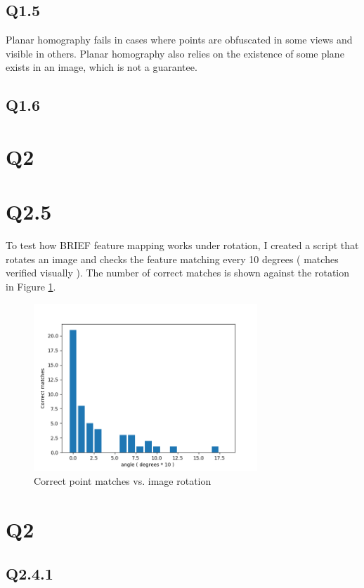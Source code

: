 \documentclass[12pt]{article}
\begin{document}
\subsection{Q1.5}
Planar homography fails in cases where points are obfuscated in some views and visible in others. Planar homography also relies on the existence of some plane exists in an image, which is not a guarantee.
\subsection{Q1.6}

\section{Q2}
\section{Q2.5}
To test how BRIEF feature mapping works under rotation, I created a script that rotates an image and checks the feature matching every 10 degrees ( matches verified visually ). The number of correct matches is shown against the rotation in Figure \ref{fig:imgrot}.
\begin{figure}[H]
\centering
\includegraphics[page=1,width=0.75\textwidth]{q2_5}
\caption{ Correct point matches vs. image rotation } 
\label{fig:imgrot}
\end{figure}   


\section { Q2 }
\subsection { Q2.4.1 }
\end{document}
